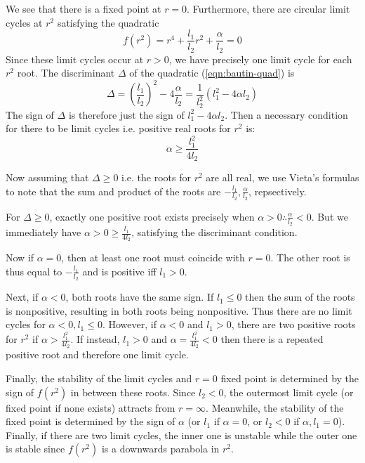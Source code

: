 \documentclass[letterpaper,12pt]{article}
\numberwithin{table}{section}
\numberwithin{figure}{section}
\numberwithin{equation}{section}
\begin{document}
\begin{flushleft}
    We see that there is a fixed point at $r = 0$. Furthermore, there are circular limit cycles at $r^2$ satisfying the quadratic
    \begin{equation}
        \label{eqn:bautin-quad}
        f(r^2) = r^4 + \frac{l_1}{l_2} r^2 + \frac{\alpha}{l_2} = 0
    \end{equation}
    Since these limit cycles occur at $r > 0$, we have precisely one limit cycle for each $r^2$ root. The discriminant $\Delta$ of the quadratic (\ref{eqn:bautin-quad}) is
    \begin{equation}
        \Delta = \left(\frac{l_1}{l_2}\right)^2 - 4\frac{\alpha}{l_2} = \frac{1}{l_2^2} \left(l_1^2 - 4\alpha l_2\right)
    \end{equation}
    The sign of $\Delta$ is therefore just the sign of $l_1^2 - 4\alpha l_2$. Then a necessary condition for there to be limit cycles i.e. positive real roots for $r^2$ is:
    \begin{equation}
        \alpha \geq \frac{l_1^2}{4l_2}
    \end{equation}

    Now assuming that $\Delta \geq 0$ i.e. the roots for $r^2$ are all real, we use Vieta's formulas to note that the sum and product of the roots are $-\frac{l_1}{l_2}, \frac{\alpha}{l_2}$, repsectively.
    
    For $\Delta \geq 0$, exactly one positive root exists precisely when $\alpha > 0 \therefore \frac{\alpha}{l_2} < 0$. But we immediately have $\alpha > 0 \geq \frac{l_1}{4l_2}$, satisfying the discriminant condition.

    Now if $\alpha = 0$, then at least one root must coincide with $r = 0$. The other root is thus equal to $-\frac{l_1}{l_2}$ and is positive iff $l_1 > 0$.

    Next, if $\alpha < 0$, both roots have the same sign. If $l_1 \leq 0$ then the sum of the roots is nonpositive, resulting in both roots being nonpositive. Thus there are no limit cycles for $\alpha < 0, l_1 \leq 0$. However, if $\alpha < 0$ and $l_1 > 0$, there are two positive roots for $r^2$ if $\alpha > \frac{l_1^2}{4l_2}$. If instead, $l_1 > 0$ and $\alpha = \frac{l_1^2}{4l_2} < 0$ then there is a repeated positive root and therefore one limit cycle.

    Finally, the stability of the limit cycles and $r = 0$ fixed point is determined by the sign of $f(r^2)$ in between these roots. Since $l_2 < 0$, the outermost limit cycle (or fixed point if none exists) attracts from $r = \infty$. Meanwhile, the stability of the fixed point is determined by the sign of $\alpha$ (or $l_1$ if $\alpha = 0$, or $l_2 < 0$ if $\alpha, l_1 = 0$). Finally, if there are two limit cycles, the inner one is unstable while the outer one is stable since $f(r^2)$ is a downwards parabola in $r^2$.


\end{flushleft}
\end{document}
